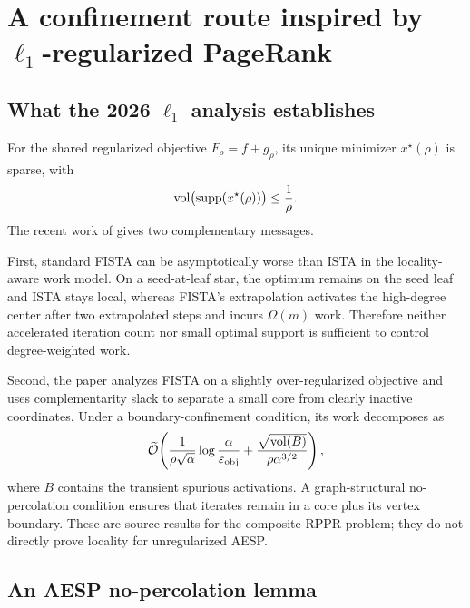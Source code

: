 \section{A confinement route inspired by \texorpdfstring{\(\ell_1\)}{l1}-regularized PageRank}
\label{sec:confinement}

\subsection{What the 2026 \texorpdfstring{\(\ell_1\)}{l1} analysis establishes}

For the shared regularized objective \(F_\rho=f+g_\rho\), its unique minimizer
\(x^\star(\rho)\) is sparse, with
\begin{equation}
    \operatorname{vol}\bigl(\operatorname{supp}(x^\star(\rho))\bigr)
    \leq\frac{1}{\rho}.
    \label{eq:rppr-volume}
\end{equation}
The recent work of \citet{fountoulakis2026complexity} gives two complementary
messages.

First, standard FISTA can be asymptotically worse than ISTA in the
locality-aware work model.  On a seed-at-leaf star, the optimum remains on the
seed leaf and ISTA stays local, whereas FISTA's extrapolation activates the
high-degree center after two extrapolated steps and incurs \(\Omega(m)\)
work.  Therefore neither accelerated iteration count nor small optimal support
is sufficient to control degree-weighted work.

Second, the paper analyzes FISTA on a slightly over-regularized objective and
uses complementarity slack to separate a small core from clearly inactive
coordinates.  Under a boundary-confinement condition, its work decomposes as
\begin{equation}
    \widetilde{\mathcal O}\!\left(
       \frac{1}{\rho\sqrt\alpha}
       \log\frac{\alpha}{\varepsilon_{\mathrm{obj}}}
       +\frac{\sqrt{\operatorname{vol}(B)}}{\rho\alpha^{3/2}}
    \right),
    \label{eq:fista-boundary-bound}
\end{equation}
where \(B\) contains the transient spurious activations.  A graph-structural
no-percolation condition ensures that iterates remain in a core plus its
vertex boundary.  These are source results for the composite RPPR problem;
they do not directly prove locality for unregularized AESP.

\subsection{An AESP no-percolation lemma}

